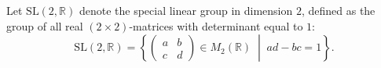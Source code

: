 Let $\mathrm{SL}(2, \mathbb{R})$ denote the special linear group in dimension $2$, defined as the group of all real $(2 \times 2)$-matrices with determinant equal to $1$:
$$
\mathrm{SL}(2, \mathbb{R}) = \left\{ \begin{pmatrix} a & b \\ c & d \end{pmatrix} \in M_2(\mathbb{R}) \;\middle|\; ad - bc = 1 \right\}.
$$
